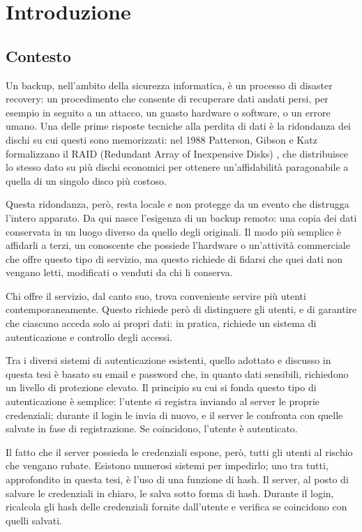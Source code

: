 \chapter{Introduzione}
\label{chap:introduzione}

\section{Contesto}

Un backup, nell'ambito della sicurezza informatica, è un processo di disaster recovery: un procedimento
che consente di recuperare dati andati persi, per esempio in seguito a un attacco, un guasto hardware o
software, o un errore umano. Una delle prime risposte tecniche alla perdita di dati è la ridondanza dei dischi su
cui questi sono memorizzati: nel 1988 Patterson, Gibson e Katz formalizzano il RAID (Redundant Array of
Inexpensive Disks) \cite{patterson-gibson-katz-raid-1988}, che distribuisce lo stesso dato su più dischi 
economici per ottenere un'affidabilità paragonabile a quella di un singolo disco più costoso.

Questa ridondanza, però, resta locale e non protegge da un evento che distrugga l'intero apparato. Da
qui nasce l'esigenza di un backup remoto: una copia dei dati conservata in un luogo diverso da quello
degli originali. Il modo più semplice è affidarli a terzi, un conoscente che possiede l'hardware o
un'attività commerciale che offre questo tipo di servizio, ma questo richiede di fidarsi che quei dati
non vengano letti, modificati o venduti da chi li conserva.

Chi offre il servizio, dal canto suo, trova conveniente servire più utenti contemporaneamente. Questo
richiede però di distinguere gli utenti, e di garantire che ciascuno acceda solo ai propri dati: in
pratica, richiede un sistema di autenticazione e controllo degli accessi.

Tra i diversi sistemi di autenticazione esistenti, quello adottato e discusso in questa tesi è basato su 
email e password che, in quanto dati sensibili, richiedono un livello di protezione elevato. 
Il principio su cui si fonda questo tipo di autenticazione è semplice:
l'utente si registra inviando al server le proprie credenziali; durante il login le invia di nuovo, e il
server le confronta con quelle salvate in fase di registrazione. Se coincidono, l'utente è autenticato.

Il fatto che il server possieda le credenziali espone, però, tutti gli utenti al rischio che vengano
rubate. Esistono numerosi sistemi per impedirlo; uno tra tutti, approfondito in questa tesi, è l'uso di
una funzione di hash.
Il server, al posto di salvare le credenziali in chiaro, le salva
sotto forma di hash. Durante il login, ricalcola gli hash delle credenziali fornite dall'utente e
verifica se coincidono con quelli salvati.

